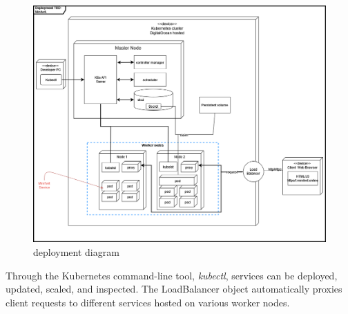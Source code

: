 \begin{figure}[H]
    \centering
    \includegraphics[scale=0.418]{images/deployment_diagrams/devopsdiagrams-deployment k8s.drawio(1).png}
    \caption{\mini deployment diagram}
    \label{fig:figdeploy}
\end{figure}
Through the Kubernetes command-line tool, \textit{kubectl}, services can be deployed, updated, scaled, and inspected. 
The LoadBalancer object automatically proxies client requests to different services hosted on various worker nodes.

